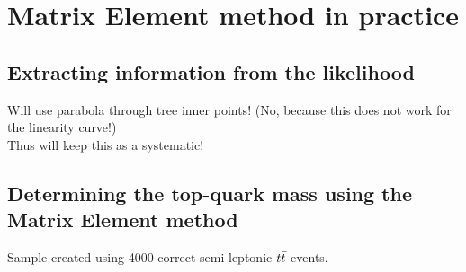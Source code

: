 %

\section{Matrix Element method in practice} \label{sec::MEMExample}
\subsection{Extracting information from the likelihood}
Will use parabola through tree inner points! (No, because this does not work for the linearity curve!)\\
Thus will keep this as a systematic!

\subsection{Determining the top-quark mass using the Matrix Element method}
Sample created using 4000 correct semi-leptonic $t\bar{t}$ events.
